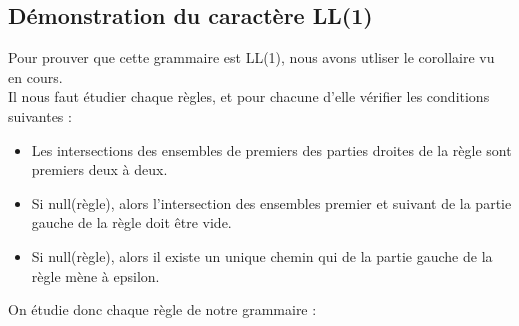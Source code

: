 \documentclass[11pt]{article} %
\begin{document}
\subsection{D\'emonstration du caract\`ere LL(1)}
Pour prouver que cette grammaire est LL(1), nous avons utliser le corollaire vu en cours.\\
Il nous faut étudier chaque règles, et pour chacune d'elle vérifier les conditions suivantes : 
\begin{itemize}
\item Les intersections des ensembles de premiers des parties droites de la règle sont premiers deux à deux.
\item Si null(règle), alors l'intersection des ensembles premier et suivant de la partie gauche de la règle doit être vide.
\item Si null(règle), alors il existe un unique chemin qui de la partie gauche de la règle mène à epsilon.
\end{itemize}
On étudie donc chaque règle de notre grammaire : 
\end{document}
